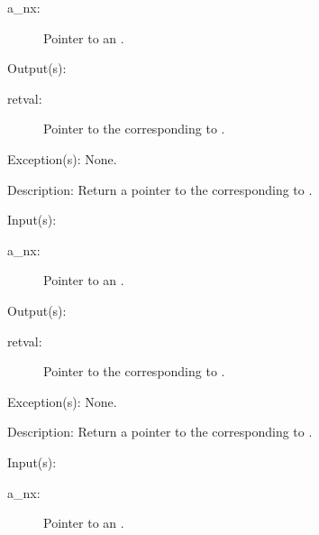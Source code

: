 \begin{capi}
\begin{capilist}
		\begin{description}\item[]
		\item[a\_nx: ]
			Pointer to an .
		\end{description}
	\item[Output(s): ]
		\begin{description}\item[]
		\item[retval: ]
			Pointer to the  corresponding to
			.
		\end{description}
	\item[Exception(s): ] None.
	\item[Description: ]
		Return a pointer to the  corresponding to
		.
	\end{capilist}
\label{nx_envdict_get}
	\begin{capilist}
	\item[Input(s): ]
		\begin{description}\item[]
		\item[a\_nx: ]
			Pointer to an .
		\end{description}
	\item[Output(s): ]
		\begin{description}\item[]
		\item[retval: ]
			Pointer to the  corresponding to
			.
		\end{description}
	\item[Exception(s): ] None.
	\item[Description: ]
		Return a pointer to the  corresponding to
		.
	\end{capilist}
\label{nx_sprintdict_get}
	\begin{capilist}
	\item[Input(s): ]
		\begin{description}\item[]
		\item[a\_nx: ]
			Pointer to an \classname{nx}.
		\end{description}

\end{capilist}
\end{capi}

